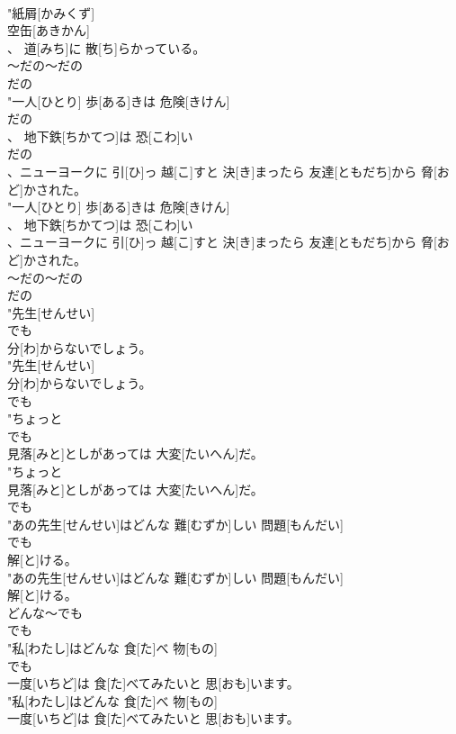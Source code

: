 \documentclass[8pt]{extreport}
\begin{document}
\begin{CJK}{UTF8}{min}
\\	"紙屑[かみくず]
\\	空缶[あきかん]
\\	、 道[みち]に 散[ち]らかっている。
\\	～だの～だの 
\\	だの
\\	"一人[ひとり] 歩[ある]きは 危険[きけん]
\\	だの
\\	、 地下鉄[ちかてつ]は 恐[こわ]い
\\	だの
\\	、ニューヨークに 引[ひ]っ 越[こ]すと 決[き]まったら 友達[ともだち]から 脅[おど]かされた。
\\	"一人[ひとり] 歩[ある]きは 危険[きけん]
\\	、 地下鉄[ちかてつ]は 恐[こわ]い
\\	、ニューヨークに 引[ひ]っ 越[こ]すと 決[き]まったら 友達[ともだち]から 脅[おど]かされた。
\\	～だの～だの 
\\	だの
\\	"先生[せんせい]
\\	でも
\\	分[わ]からないでしょう。
\\	"先生[せんせい]
\\	分[わ]からないでしょう。
\\	でも
\\	"ちょっと
\\	でも
\\	見落[みと]としがあっては 大変[たいへん]だ。
\\	"ちょっと
\\	見落[みと]としがあっては 大変[たいへん]だ。
\\	でも
\\	"あの先生[せんせい]はどんな 難[むずか]しい 問題[もんだい]
\\	でも
\\	解[と]ける。
\\	"あの先生[せんせい]はどんな 難[むずか]しい 問題[もんだい]
\\	解[と]ける。
\\	どんな～でも	
\\	でも
\\	"私[わたし]はどんな 食[た]べ 物[もの]
\\	でも
\\	一度[いちど]は 食[た]べてみたいと 思[おも]います。
\\	"私[わたし]はどんな 食[た]べ 物[もの]
\\	一度[いちど]は 食[た]べてみたいと 思[おも]います。

\end{CJK}
\end{document}
